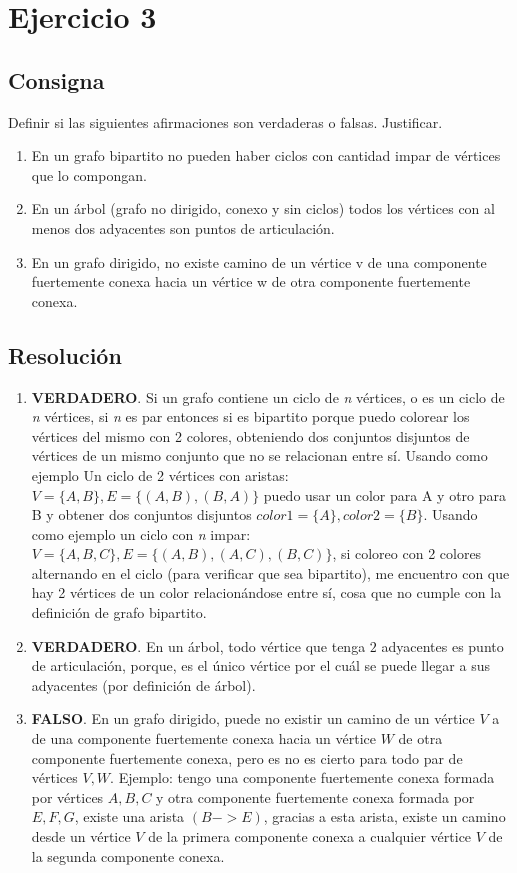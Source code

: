 \documentclass{article}
\begin{document}
\section*{Ejercicio 3}

\subsection*{Consigna}
Definir si las siguientes afirmaciones son verdaderas o falsas. Justificar.
\begin{enumerate}[label=\alph*)]
    \item En un grafo bipartito no pueden haber ciclos con cantidad impar de vértices que lo compongan.
    \item En un árbol (grafo no dirigido, conexo y sin ciclos) todos los vértices con al menos dos adyacentes son puntos de
    articulación.
    \item En un grafo dirigido, no existe camino de un vértice v de una componente fuertemente conexa hacia un vértice w de
    otra componente fuertemente conexa.
\end{enumerate}
\subsection*{Resolución}
\begin{enumerate}[label=\alph*)]
    \item \textbf{VERDADERO}. Si un grafo contiene un ciclo de \textit{n} vértices, o es un ciclo de \textit{n} vértices,
    si \textit{n} es par entonces si es bipartito porque puedo colorear los vértices del mismo con 2 colores, obteniendo
    dos conjuntos disjuntos de vértices de un mismo conjunto que no se relacionan entre sí. Usando como ejemplo Un ciclo de 2 vértices con aristas:
    $V = \{A, B\}, E = \{(A, B), (B, A)\}$ puedo usar un color para A y otro para B y obtener dos conjuntos disjuntos $color1 = \{A\}, color2 = \{B\}$. Usando como ejemplo
    un ciclo con \textit{n} impar: $V = \{A, B, C\}, E = \{(A, B), (A, C), (B, C)\}$, si coloreo con 2 colores alternando en el ciclo (para verificar
    que sea bipartito), me encuentro con que hay 2 vértices de un color relacionándose entre sí, cosa que no cumple con la definición de grafo bipartito.
    \item \textbf{VERDADERO}. En un árbol, todo vértice que tenga $2$ adyacentes es punto de articulación, porque, es el único vértice por el cuál se puede llegar a sus adyacentes (por definición de árbol).
    \item \textbf{FALSO}. En un grafo dirigido, puede no existir un camino de un vértice $V$ a de una componente fuertemente conexa hacia un vértice $W$ de otra componente fuertemente conexa, pero es no es cierto para todo par de vértices $V, W$.
    Ejemplo: tengo una componente fuertemente conexa formada por vértices $A, B, C$ y otra componente fuertemente conexa formada por $E, F, G$, existe una arista $(B->E)$, gracias a esta arista, existe un camino desde un vértice $V$ de la primera componente conexa a cualquier vértice $V$ de la segunda componente conexa.
    
\end{enumerate}
\end{document}
